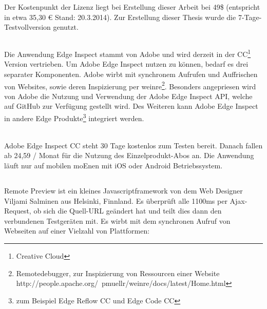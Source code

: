 	Der Kostenpunkt der Lizenz liegt bei Erstellung dieser Arbeit bei 49\$ (entspricht in etwa 35,30 € Stand: 20.3.2014). Zur Erstellung dieser Thesis wurde die 7-Tage-Testvollversion genutzt.
	
	\subsection{}
	Die Anwendung Edge Inspect stammt von Adobe und wird derzeit in der CC\footnote{Creative \Gls{Cloud}} Version vertrieben. Um Adobe Edge Inspect nutzen zu können, bedarf es drei separater Komponenten. Adobe wirbt mit synchronem Aufrufen und Auffrischen von Websites, sowie deren Inspizierung per weinre\footnote{Remotedebugger, zur Inspizierung von Ressourcen einer Website http://people.apache.org/~pmuellr/weinre/docs/latest/Home.html}. Besonders angepriesen wird von Adobe die Nutzung und Verwendung der Adobe Edge Inspect API, welche auf GitHub zur Verfügung gestellt wird. Des Weiteren kann Adobe Edge Inspect in andere Edge Produkte\footnote{zum Beispiel Edge Reflow CC und Edge Code CC} integriert werden. 
	
	\\Adobe Edge Inspect CC steht 30 Tage kostenlos zum Testen bereit. Danach fallen ab 24,59 / Monat für die Nutzung des Einzelprodukt-Abos an. Die Anwendung läuft nur auf mobilen \Gls{moEn}en mit iOS oder Android Betriebssystem.
	
	\subsection{}
	Remote Preview ist ein kleines \Gls{Javascript}framework von dem Web Designer Viljami Salminen aus Helsinki, Finnland. Es überprüft alle 1100ms per \Gls{Ajax}-Request, ob sich die Quell-URL geändert hat und teilt dies dann den verbundenen Testgeräten mit. Es wirbt mit dem synchronen Aufruf von Webseiten auf einer Vielzahl von Plattformen: 
	
